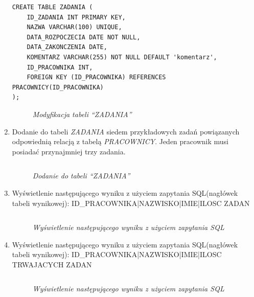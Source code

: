 \documentclass{article}
\begin{document}
\begin{enumerate}
\begin{lstlisting}[style=SQL, caption=\textit{Modyfikacja tabeli ``ZADANIA''}]
CREATE TABLE ZADANIA (
    ID_ZADANIA INT PRIMARY KEY,
    NAZWA VARCHAR(100) UNIQUE,
    DATA_ROZPOCZECIA DATE NOT NULL,
    DATA_ZAKONCZENIA DATE,
    KOMENTARZ VARCHAR(255) NOT NULL DEFAULT 'komentarz',
    ID_PRACOWNIKA INT,
    FOREIGN KEY (ID_PRACOWNIKA) REFERENCES PRACOWNICY(ID_PRACOWNIKA)
);
\end{lstlisting}

\begin{figure}[H]
	\centering
	\caption{\textit{Modyfikacja tabeli ``ZADANIA''}}
\end{figure}

\item Dodanie do tabeli \emph{ZADANIA} siedem przykładowych zadań powiązanych odpowiednią relacją z tabelą \emph{PRACOWNICY}. Jeden pracownik musi posiadać przynajmniej trzy zadania.

\begin{lstlisting}[style=SQL, caption=\textit{Dodanie do tabeli ``ZADANIA''}]
\end{lstlisting}

\begin{figure}[H]
	\centering
	\caption{\textit{Dodanie do tabeli ``ZADANIA''}}
\end{figure}

\item Wyświetlenie następującego wyniku z użyciem zapytania SQL(nagłówek tabeli wynikowej): ID\_PRACOWNIKA|NAZWISKO|IMIE|ILOSC ZADAN

\begin{lstlisting}[style=SQL, caption=\textit{Wyświetlenie następującego wyniku z użyciem zapytania SQL}]
\end{lstlisting}

\begin{figure}[H]
	\centering
	\caption{\textit{Wyświetlenie następującego wyniku z użyciem zapytania SQL}}
\end{figure}

\item Wyświetlenie następującego wyniku z użyciem zapytania SQL(nagłówek tabeli wynikowej): ID\_PRACOWNIKA|NAZWISKO|IMIE|ILOSC TRWAJACYCH ZADAN

\begin{lstlisting}[style=SQL, caption=\textit{Wyświetlenie następującego wyniku z użyciem zapytania SQL}]
\end{lstlisting}

\begin{figure}[H]
	\centering
	\caption{\textit{Wyświetlenie następującego wyniku z użyciem zapytania SQL}}
\end{figure}


\end{enumerate}
\end{document}

